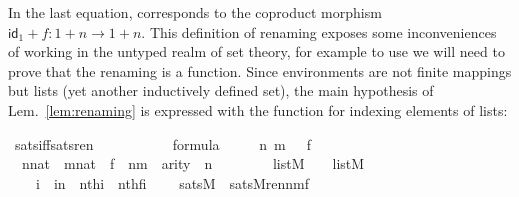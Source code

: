 In the last equation,  corresponds to
the coproduct morphism $\mathsf{id}_{1}+f \colon 1 + n \to 1 +
n$. This definition of renaming exposes some inconveniences of working
in the untyped realm of set theory, for example to use  we
will need to prove that the renaming is a function. Since environments
are not finite mappings but lists (yet another inductively defined
set), the main hypothesis of Lem.~\ref{lem:renaming} is expressed with
the  function for indexing elements of lists:
\begin{isabelle}
\isamarkupfalse%
\ sats{\isacharunderscore}iff{\isacharunderscore}sats{\isacharunderscore}ren\ {\isacharcolon}\ \isanewline
\ \ \ {\isasymphi}\isanewline
\ \ \ {\isachardoublequoteopen}{\isasymphi}\ {\isasymin}\ formula{\isachardoublequoteclose}\isanewline
\ \ \ \ {\isachardoublequoteopen}{\isasymAnd}\ n\ m\ {\isasymrho}\ {\isasymrho}{\isacharprime}\ f\ {\isachardot}\ \isanewline
\ \ {\isasymlbrakk}n{\isasymin}nat\ {\isacharsemicolon}\ m{\isasymin}nat\ {\isacharsemicolon}\ f\ {\isasymin}\ n{\isasymrightarrow}m\ {\isacharsemicolon}\ arity{\isacharparenleft}{\isasymphi}{\isacharparenright}\ {\isasymle}\ n\ {\isacharsemicolon}\isanewline
\ \ \ \ \ {\isasymrho}\ {\isasymin}\ list{\isacharparenleft}M{\isacharparenright}\ {\isacharsemicolon}\ {\isasymrho}{\isacharprime}\ {\isasymin}\ list{\isacharparenleft}M{\isacharparenright}\ {\isacharsemicolon}\ \isanewline
\ \ \ {\isasymAnd}\ i\ {\isachardot}\ i{\isacharless}n\ {\isasymLongrightarrow}\ nth{\isacharparenleft}i{\isacharcomma}{\isasymrho}{\isacharparenright}\ {\isacharequal}\ nth{\isacharparenleft}f{\isacharbackquote}i{\isacharcomma}{\isasymrho}{\isacharprime}{\isacharparenright}\ {\isasymrbrakk}\ {\isasymLongrightarrow}\isanewline
\ \ sats{\isacharparenleft}M{\isacharcomma}{\isasymphi}{\isacharcomma}{\isasymrho}{\isacharparenright}\ {\isasymlongleftrightarrow}\ sats{\isacharparenleft}M{\isacharcomma}ren{\isacharparenleft}{\isasymphi}{\isacharparenright}{\isacharbackquote}n{\isacharbackquote}m{\isacharbackquote}f{\isacharcomma}{\isasymrho}{\isacharprime}{\isacharparenright}{\isachardoublequoteclose}\end{isabelle}


